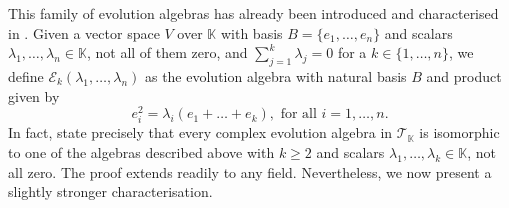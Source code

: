 \documentclass[12pt,reqno]{amsart}
\theoremstyle{definition}
\theoremstyle{remark}
\numberwithin{equation}{section}
\begin{document}
This family of evolution algebras has already been introduced and characterised in \cite{CGOT_13}. Given a vector space $V$ over $\mathbb{K}$ with basis $B=\{e_1,\dots,e_n\}$ and scalars $\lambda_1,\dots,\lambda_n\in\mathbb{K}$, not all of them zero, and $\sum_{j=1}^{k}\lambda_j=0$ for a $k\in\{1,\dots,n\}$, we define $\mathcal{E}_k(\lambda_1,\dots,\lambda_n)$ as the evolution algebra with natural basis $B$ and product given by \[e_i^2=\lambda_i(e_1+\dots+e_k), \text{ for all } i=1,\dots,n.\] In fact, \cite[Proposition~2.5 \& Remark~2.6]{CGOT_13} state precisely that every complex evolution algebra in $\mathcal{T}_\mathbb{K}$ is isomorphic to one of the algebras described above with $k\geq2$ and scalars $\lambda_1,\dots,\lambda_k\in\mathbb{K}$, not all zero. The proof extends readily to any field. Nevertheless, we now present a slightly stronger characterisation.
\end{document}
